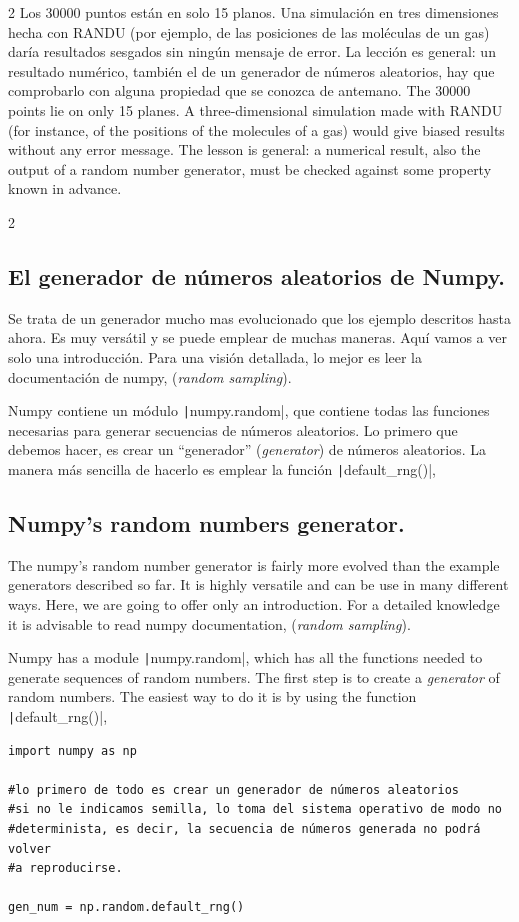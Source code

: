 \begin{paracol}{2}
Los $30000$ puntos están en solo 15 planos. Una simulación en tres dimensiones hecha con RANDU (por ejemplo, de las posiciones de las moléculas de un gas) daría resultados sesgados sin ningún mensaje de error. La lección es general: un resultado numérico, también el de un generador de números aleatorios, hay que comprobarlo con alguna propiedad que se conozca de antemano.
\switchcolumn
The $30000$ points lie on only 15 planes. A three-dimensional simulation made with RANDU (for instance, of the positions of the molecules of a gas) would give biased results without any error message. The lesson is general: a numerical result, also the output of a random number generator, must be checked against some property known in advance.
\end{paracol}

\begin{paracol}{2}
\subsection{El generador de números aleatorios de Numpy.}\label{rand} Se trata de un generador mucho mas evolucionado que los ejemplo descritos hasta ahora. Es muy versátil y se puede emplear de muchas maneras. Aquí vamos a ver solo una introducción. Para una visión detallada, lo mejor es leer la documentación de numpy, (\emph{random sampling}).

Numpy contiene un módulo  \texttt|numpy.random|, que contiene todas las funciones necesarias para generar secuencias de números aleatorios. Lo primero que debemos hacer, es crear un ``generador'' (\emph{generator}) de números aleatorios. La manera más sencilla de hacerlo es emplear la función \texttt|default_rng()|,

\switchcolumn
\subsection{Numpy's random numbers generator.} The numpy's random number generator is fairly more evolved than the example generators described so far. It is highly versatile and can be use in many different ways. Here, we are going to offer only an introduction. For a detailed knowledge it is advisable to read numpy documentation, (\emph{random sampling}).

Numpy has a module \texttt|numpy.random|, which has all the functions needed to generate sequences of random numbers. The first step is to create a \emph{generator} of random numbers. The easiest way to do it is by using the function \texttt|default_rng()|,  
\end{paracol}
\begin{verbatim}
import numpy as np

#lo primero de todo es crear un generador de números aleatorios
#si no le indicamos semilla, lo toma del sistema operativo de modo no
#determinista, es decir, la secuencia de números generada no podrá volver
#a reproducirse.

gen_num = np.random.default_rng()
\end{verbatim}
 
